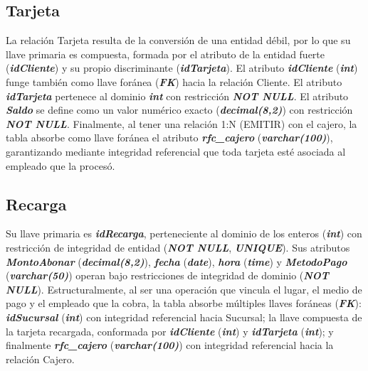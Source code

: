 \documentclass[11pt,letterpaper,spanish]{article}
\begin{document}
\subsection{Tarjeta}
La relación Tarjeta resulta de la conversión de una entidad débil, por lo que su llave primaria es compuesta, formada por el atributo de la entidad fuerte (\textbf{\textit{idCliente}}) y su propio discriminante (\textbf{\textit{idTarjeta}}). El atributo \textbf{\textit{idCliente}} (\textbf{\textit{int}}) funge también como llave foránea (\textbf{\textit{FK}}) hacia la relación Cliente. El atributo \textbf{\textit{idTarjeta}} pertenece al dominio \textbf{\textit{int}} con restricción \textbf{\textit{NOT NULL}}. El atributo \textbf{\textit{Saldo}} se define como un valor numérico exacto (\textbf{\textit{decimal(8,2)}}) con restricción \textbf{\textit{NOT NULL}}. Finalmente, al tener una relación 1:N (EMITIR) con el cajero, la tabla absorbe como llave foránea el atributo \textbf{\textit{rfc\_cajero}} (\textbf{\textit{varchar(100)}}), garantizando mediante integridad referencial que toda tarjeta esté asociada al empleado que la procesó.

\subsection{Recarga}
Su llave primaria es \textbf{\textit{idRecarga}}, perteneciente al dominio de los enteros (\textbf{\textit{int}}) con restricción de integridad de entidad (\textbf{\textit{NOT NULL}}, \textbf{\textit{UNIQUE}}). Sus atributos \textbf{\textit{MontoAbonar}} (\textbf{\textit{decimal(8,2)}}), \textbf{\textit{fecha}} (\textbf{\textit{date}}), \textbf{\textit{hora}} (\textbf{\textit{time}}) y \textbf{\textit{MetodoPago}} (\textbf{\textit{varchar(50)}}) operan bajo restricciones de integridad de dominio (\textbf{\textit{NOT NULL}}). Estructuralmente, al ser una operación que vincula el lugar, el medio de pago y el empleado que la cobra, la tabla absorbe múltiples llaves foráneas (\textbf{\textit{FK}}): \textbf{\textit{idSucursal}} (\textbf{\textit{int}}) con integridad referencial hacia Sucursal; la llave compuesta de la tarjeta recargada, conformada por \textbf{\textit{idCliente}} (\textbf{\textit{int}}) y \textbf{\textit{idTarjeta}} (\textbf{\textit{int}}); y finalmente \textbf{\textit{rfc\_cajero}} (\textbf{\textit{varchar(100)}}) con integridad referencial hacia la relación Cajero.
\end{document}
